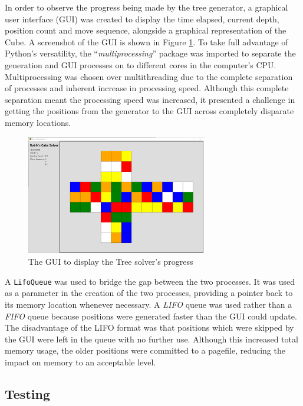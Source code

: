 \documentclass{report}
\newcommand{\tit}[1]{\textit{#1}}
\newcommand{\propernoun}[1]{\enquote{\tit{#1}}}
\begin{document}
    In order to observe the progress being made by the tree generator, a graphical user interface (GUI) was created to display the time elapsed, current depth, position count and move sequence, alongside a graphical representation of the Cube. A screenshot of the GUI is shown in Figure \ref{fig:imgTreeSolveGUI}. To take full advantage of Python's versatility, the \propernoun{multiprocessing} package was imported to separate the generation and GUI processes on to different cores in the computer's CPU. Multiprocessing was chosen over multithreading due to the complete separation of processes and inherent increase in processing speed. Although this complete separation meant the processing speed was increased, it presented a challenge in getting the positions from the generator to the GUI across completely disparate memory locations.
    
   	\begin{figure}[H]
    	\centering
    	\includegraphics[width=0.7\textwidth]{Resources/Images/imgTreeSolveGUI}
    	\caption{The GUI to display the Tree solver's progress}
    	\label{fig:imgTreeSolveGUI}
    \end{figure}
    
    A \lstinline|LifoQueue| was used to bridge the gap between the two processes. It was used as a parameter in the creation of the two processes, providing a pointer back to its memory location whenever necessary. A \tit{LIFO} queue was used rather than a \tit{FIFO} queue because positions were generated faster than the GUI could update. The disadvantage of the LIFO format was that positions which were skipped by the GUI were left in the queue with no further use. Although this increased total memory usage, the older positions were committed to a pagefile, reducing the impact on memory to an acceptable level.
    
    \subsection{Testing}
\end{document}
